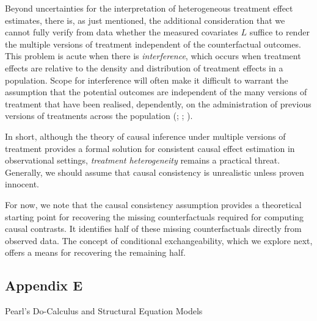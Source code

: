 \documentclass[
  single column]{article}
\begin{document}
Beyond uncertainties for the interpretation of heterogeneous treatment
effect estimates, there is, as just mentioned, the additional
consideration that we cannot fully verify from data whether the measured
covariates \(L\) suffice to render the multiple versions of treatment
independent of the counterfactual outcomes. This problem is acute when
there is \emph{interference}, which occurs when treatment effects are
relative to the density and distribution of treatment effects in a
population. Scope for interference will often make it difficult to
warrant the assumption that the potential outcomes are independent of
the many versions of treatment that have been realised, dependently, on
the administration of previous versions of treatments across the
population (;
;
).

In short, although the theory of causal inference under multiple
versions of treatment provides a formal solution for consistent causal
effect estimation in observational settings, \emph{treatment
heterogeneity} remains a practical threat. Generally, we should assume
that causal consistency is unrealistic unless proven innocent.

For now, we note that the causal consistency assumption provides a
theoretical starting point for recovering the missing counterfactuals
required for computing causal contrasts. It identifies half of these
missing counterfactuals directly from observed data. The concept of
conditional exchangeability, which we explore next, offers a means for
recovering the remaining half.

\newpage{}

\subsection{Appendix E}\label{appendix-e}

Pearl's Do-Calculus and Structural Equation Models
\end{document}
